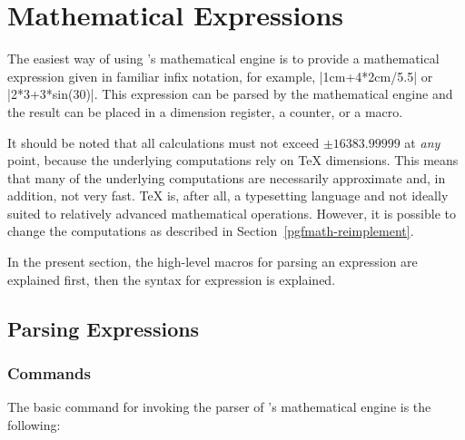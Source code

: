 %
%
%
%

\section{Mathematical Expressions}

\label{pgfmath-syntax}

The easiest way of using \pgfname's mathematical engine is to provide
a mathematical expression given in familiar infix notation, for
example, |1cm+4*2cm/5.5| or |2*3+3*sin(30)|. This expression can be
parsed by the mathematical engine and the result can be placed in a
dimension register, a counter, or a macro.

It should be noted that all
calculations must not exceed $\pm16383.99999$ at \emph{any} point,
because the underlying computations rely on \TeX{} dimensions. This
means that many of the underlying computations are necessarily
approximate and, in addition, not very fast. \TeX{} is,
after all, a typesetting language and not ideally
suited to relatively advanced mathematical operations. However, it
is possible to change the computations as described in
Section~\ref{pgfmath-reimplement}.

In the present section, the high-level macros for parsing an
expression are explained first, then the syntax for expression is
explained.


\subsection{Parsing Expressions}

\label{pgfmath-registers}

\label{pgfmath-parsing}

\subsubsection{Commands}

The basic command for invoking the parser of \pgfname's mathematical
engine is the following:

